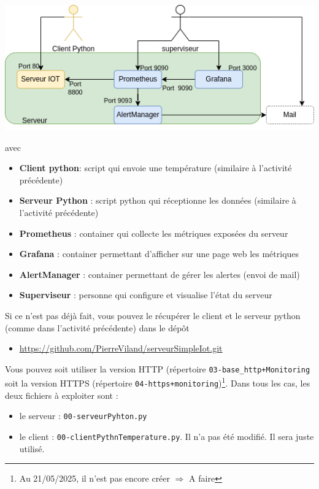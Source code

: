 \documentclass[french, 12pt]{article}%
\newcommand{\itemE}{\item[$\bullet$]}
\begin{document}
\begin{center}
\includegraphics[scale=0.7]{./ressource/schemIotPrometeus.drawio.png}
\end{center}
avec
\begin{itemize}
\itemE \textbf{Client python}: script qui envoie une température (similaire à l'activité précédente)
\itemE \textbf{Serveur Python} : script python qui réceptionne les données (similaire à l'activité précédente)
\itemE \textbf{Prometheus} : container qui collecte les métriques exposées du serveur
\itemE \textbf{Grafana} : container permettant d'afficher sur une page web les métriques
\itemE \textbf{AlertManager} : container permettant de gérer les alertes (envoi de mail)
\itemE \textbf{Superviseur} : personne qui configure et visualise l'état du serveur
\end{itemize}


\vspace{0.5cm}
Si ce n'est pas déjà fait, vous pouvez le récupérer le client et le serveur python (comme dans l'activité précédente) dans le dépôt  
\begin{itemize}
\itemE \href{https://github.com/PierreViland/serveurSimpleIot.git}{https://github.com/PierreViland/serveurSimpleIot.git}
\end{itemize}


\vspace{0.5cm}
Vous pouvez soit utiliser la version HTTP (répertoire \verb?03-base_http+Monitoring? soit la version HTTPS (répertoire \verb?04-https+monitoring?)\footnote{Au 21/05/2025, il n'est pas encore créer $\Rightarrow$ A faire}. Dans tous les cas, les deux fichiers à exploiter sont : 

\begin{itemize}
\itemE le serveur : \verb?00-serveurPyhton.py?
\itemE le client : \verb?00-clientPythnTemperature.py?. Il n'a pas été modifié. Il sera juste utilisé. 
\end{itemize}

\end{document}
